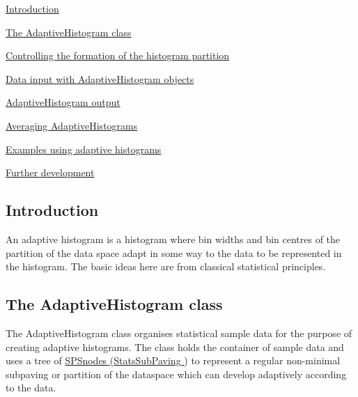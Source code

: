 
\begin{DoxyItemize}
\item \hyperlink{AdaptiveHistograms_adhsec_intro}{\-Introduction}
\item \hyperlink{AdaptiveHistograms_adhsec_adhclass}{\-The \-Adaptive\-Histogram class}
\item \hyperlink{AdaptiveHistograms_adhsec_tree}{\-Controlling the formation of the histogram partition}
\item \hyperlink{AdaptiveHistograms_adhsec_inputdata}{\-Data input with \-Adaptive\-Histogram objects}
\item \hyperlink{AdaptiveHistograms_adhsec_output}{\-Adaptive\-Histogram output}
\item \hyperlink{AdaptiveHistograms_adhsec_averaging}{\-Averaging \-Adaptive\-Histograms}
\item \hyperlink{AdaptiveHistograms_adhsec_examples}{\-Examples using adaptive histograms}
\item \hyperlink{AdaptiveHistograms_adhsec_furtherdev}{\-Further development}
\end{DoxyItemize}



\hypertarget{AdaptiveHistograms_adhsec_intro}{}\subsection{\-Introduction}\label{AdaptiveHistograms_adhsec_intro}
\-An adaptive histogram is a histogram where bin widths and bin centres of the partition of the data space adapt in some way to the data to be represented in the histogram. \-The basic ideas here are from classical statistical principles.



\hypertarget{AdaptiveHistograms_adhsec_adhclass}{}\subsection{\-The Adaptive\-Histogram class}\label{AdaptiveHistograms_adhsec_adhclass}
\-The \-Adaptive\-Histogram class organises statistical sample data for the purpose of creating adaptive histograms. \-The class holds the container of sample data and uses a tree of \hyperlink{classsubpavings_1_1SPSnode}{\-S\-P\-Snodes } (\hyperlink{namespacesubpavings_ace6b16f0adf0db13eeb38e124d5328c6}{\-Stats\-Sub\-Paving }) to represent a regular non-\/minimal subpaving or partition of the dataspace which can develop adaptively according to the data.

